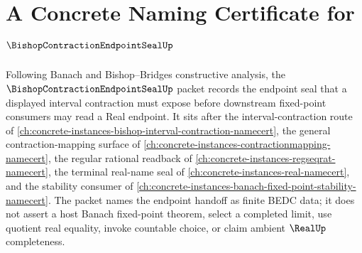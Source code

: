 \chapter{A Concrete Naming Certificate for $\BishopContractionEndpointSealUp$}
\label{ch:concrete-instances-bishop-contraction-endpoint-seal-namecert}

Following Banach and Bishop--Bridges constructive analysis, the $\BishopContractionEndpointSealUp$ packet records the endpoint seal that a displayed interval contraction must expose before downstream fixed-point consumers may read a Real endpoint. It sits after the interval-contraction route of \autoref{ch:concrete-instances-bishop-interval-contraction-namecert}, the general contraction-mapping surface of \autoref{ch:concrete-instances-contractionmapping-namecert}, the regular rational readback of \autoref{ch:concrete-instances-regseqrat-namecert}, the terminal real-name seal of \autoref{ch:concrete-instances-real-namecert}, and the stability consumer of \autoref{ch:concrete-instances-banach-fixed-point-stability-namecert}. The packet names the endpoint handoff as finite BEDC data; it does not assert a host Banach fixed-point theorem, select a completed limit, use quotient real equality, invoke countable choice, or claim ambient $\RealUp$ completeness.

